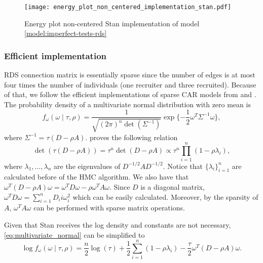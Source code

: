 \begin{figure}[htb]
  \centering
  \caption{\label{fig:energy_plot_non_centered_implementation_stan}Energy plot
  non-centered Stan implementation of model \eqref{model:imperfect-tests-rds}}
  \texttt{[image: energy\_plot\_non\_centered\_implementation\_stan.pdf]}
\end{figure}

\subsubsection*{Efficient implementation}

RDS connection matrix is essentially sparse since the number of edges is at
most four times the number of individuals (one recruiter and three
recruited). Because of that, we follow the efficient implementations of sparse
CAR models
from \textcite{donegan2021spatial} and \textcite{exactcar}. The probability
density of a multivariate normal distribution with zero mean is 
\begin{equation}
  \label{eq:multivariate_normal}
  f_{\omega}(\omega \mid \tau, \rho) = \frac{1}{\sqrt{(2\pi)^n\det(\Sigma^{-1})}
  }\exp\{-\frac{1}{2}\omega^T\Sigma^{-1}\omega\}, 
\end{equation}
where $\Sigma^{-1} = \tau(D - \rho A)$. \textcite[p. 955]{jin2005generalized}
proves the following relation
$$
\det(\tau(D - \rho A)) = \tau^n \det(D - \rho A) \propto \tau^n \prod_{i=1}^n (1 - \rho \lambda_i), 
$$
where $\lambda_1, \dots, \lambda_n$ are the eigenvalues of $D^{-1/2} A
D^{-1/2}$. Notice that $\{\lambda_i\}_{i=1}^n$ are calculated before of the
HMC algorithm. We also have that $\omega^T(D - \rho A)\omega = \omega^T D \omega - \rho \omega^T A
\omega$. Since $D$ is a diagonal matrix, $\omega^T D \omega = \sum_{i=1}^n
D_ii\omega_i^2$ which can be easily calculated. Moreover, by the sparsity of $A$,
$\omega^T A \omega$ can be performed with sparse matrix operations. 

Given that Stan receives the log density and constants are not necessary,
\eqref{eq:multivariate_normal} can be simplified to 
\begin{equation*}
  \log f_{\omega}(\omega \mid \tau, \rho) = \frac{n}{2}\log(\tau) + 
  \frac{1}{2}\sum_{i=1}^n(1 - \rho \lambda_i) - \frac{\tau}{2}\omega^T(D - \rho A)\omega.
\end{equation*}

